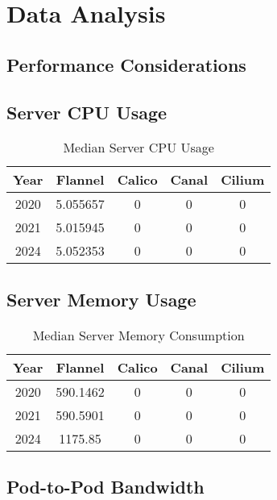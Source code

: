 %
%

\pagebreak
\section{Data Analysis}

\onehalfspacing

\subsection{Performance Considerations}

\subsection{Server CPU Usage}

\begin{table}[h!]
\caption{Median Server CPU Usage}
\begin{tabular}{|c | c | c | c | c|} 
 \hline
 Year & Flannel & Calico & Canal & Cilium \\
 \hline\hline
 2020 & 5.055657 & 0 & 0 & 0 \\ 
 \hline
 2021 & 5.015945 & 0 & 0 & 0 \\
 \hline
 2024 & 5.052353 & 0 & 0 & 0 \\
 \hline
\end{tabular}
\label{tab:cpu}
\end{table}

\subsection{Server Memory Usage}

\begin{table}[h!]
\caption{Median Server Memory Consumption}
\begin{tabular}{|c | c | c | c | c|} 
 \hline
 Year & Flannel & Calico & Canal & Cilium \\
 \hline\hline
 2020 & 590.1462 & 0 & 0 & 0 \\ 
 \hline
 2021 & 590.5901 & 0 & 0 & 0 \\
 \hline
 2024 & 1175.85 & 0 & 0 & 0 \\
 \hline
\end{tabular}
\label{tab:mem}
\end{table}

\subsection{Pod-to-Pod Bandwidth}


